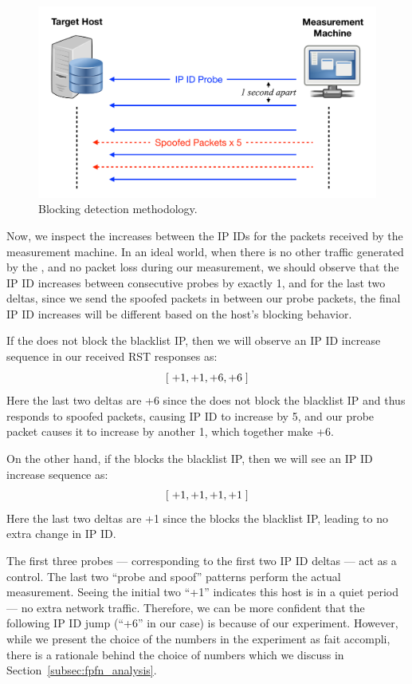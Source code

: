 \begin{figure}[t]
\centering
\includegraphics[width=0.85\columnwidth]{data_usage/images/croped_design_implementation.pdf}
\caption{Blocking detection methodology.}
\label{fig:design_implementation}
\end{figure}

Now, we inspect the increases between the IP IDs for the packets received by the
measurement machine. In an ideal world, when there is no other traffic
generated by the {}, and no packet loss during our measurement, we
should observe that the IP ID increases between consecutive probes by exactly
1, and for the last two deltas, since we send the spoofed packets in between
our probe packets, the final IP ID increases will be different based on the
host's blocking behavior.

If the {} does not block the blacklist IP, then
we will observe an IP ID increase sequence in our received RST responses as:
\[[\hspace{0.1cm} +1, +1, +6, +6 \hspace{0.1cm}]\]
Here the last two deltas are +6 since the {} does not block the
blacklist IP and thus responds to spoofed packets, causing IP ID to increase by
5, and our probe packet causes it to increase by another 1, which together make +6.

On the other hand, if the {} blocks the blacklist IP, then we will see an IP
ID increase sequence as:
\[ [\hspace{0.1cm} +1, +1, +1, +1 \hspace{0.1cm}] \]
Here the last two deltas are +1 since the {} blocks the blacklist IP,
leading to no extra change in IP ID.

The first three probes --- corresponding to the first two IP ID deltas --- act as a
control. The last two ``probe and spoof'' patterns perform the actual measurement.
Seeing the initial two ``+1'' indicates this host is in a quiet period --- no
extra network traffic. Therefore, we can be more confident that the following
IP ID jump (``+6'' in our case) is because of our experiment. However,
while we present the choice of the numbers in the experiment as fait accompli,
there is a rationale behind the choice of numbers which we discuss in Section~\ref{subsec:fpfn_analysis}.


